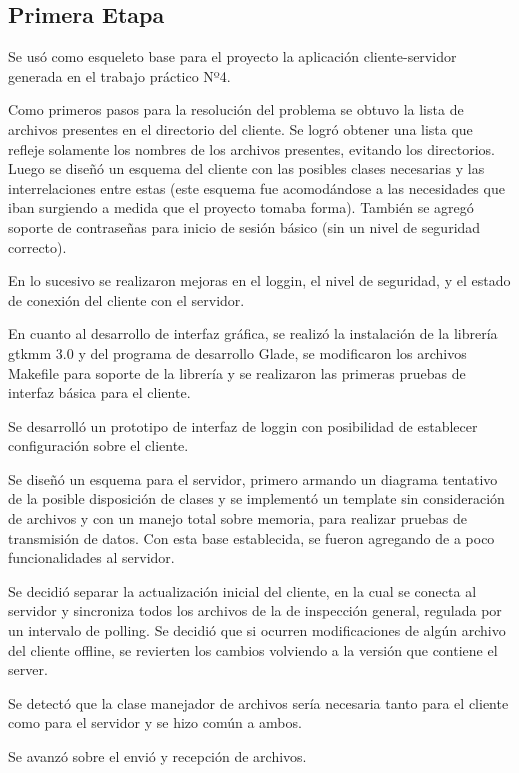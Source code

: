 \documentclass{article}
\begin{document}
\subsection{Primera Etapa}
\smallskip
	Se usó como esqueleto base para el proyecto la aplicación cliente-servidor generada en el trabajo práctico Nº4.
	\par
	Como primeros pasos para la resolución del problema se obtuvo la lista de archivos presentes en el directorio del cliente. Se logró obtener una lista que refleje solamente los nombres de los archivos presentes, evitando los directorios. Luego se diseñó un esquema del cliente con las posibles clases necesarias y las interrelaciones entre estas (este esquema fue acomodándose a las necesidades que iban surgiendo a medida que el proyecto tomaba forma). También se agregó soporte de contraseñas para inicio de sesión básico (sin un nivel de seguridad correcto).
	\par
	En lo sucesivo se realizaron mejoras en el loggin, el nivel de seguridad, y el estado de conexión del cliente con el servidor.
	\par
	En cuanto al desarrollo de interfaz gráfica, se realizó la instalación de la librería gtkmm 3.0 y del programa de desarrollo Glade, se modificaron los archivos Makefile para soporte de la librería y se realizaron las primeras pruebas de interfaz básica para el cliente.
	\par
	Se desarrolló un prototipo de interfaz de loggin con posibilidad de establecer configuración sobre el cliente.
	\par
	Se diseñó un esquema para el servidor, primero armando un diagrama tentativo de la posible disposición de clases y se implementó un template sin consideración de archivos y con un manejo total sobre memoria, para realizar pruebas de transmisión de datos. Con esta base establecida, se fueron agregando de a poco funcionalidades al servidor. 

	Se decidió separar la actualización inicial del cliente, en la cual se conecta al servidor y sincroniza todos los archivos de la de inspección general, regulada por un intervalo de polling. Se decidió que si ocurren modificaciones de algún archivo del cliente offline, se revierten los cambios volviendo a la versión que contiene el server.
	\par
	Se detectó que la clase manejador de archivos sería necesaria tanto para el cliente como para el servidor y se hizo común a ambos.
	\par
	Se avanzó sobre el envió y recepción de archivos.
\bigskip
\end{document}
